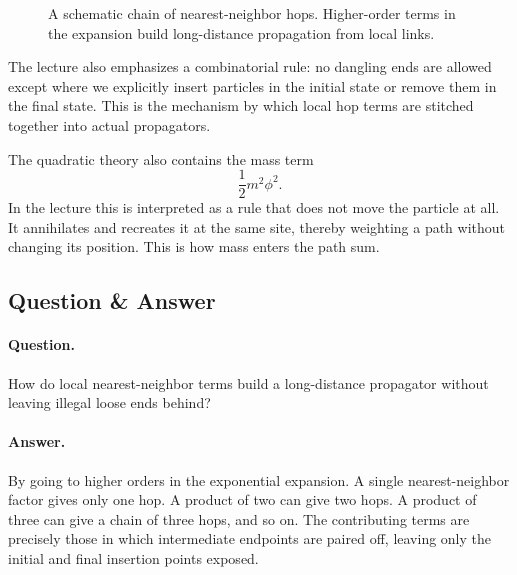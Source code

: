 \begin{figure}[h]
\centering
{}
\caption{A schematic chain of nearest-neighbor hops. Higher-order terms in the expansion build long-distance propagation from local links.}
\end{figure}

The lecture also emphasizes a combinatorial rule: no dangling ends are allowed except where we explicitly insert particles in the initial state or remove them in the final state. This is the mechanism by which local hop terms are stitched together into actual propagators.

The quadratic theory also contains the mass term
\begin{equation}
\frac{1}{2}m^2\phi^2.
\end{equation}
In the lecture this is interpreted as a rule that does not move the particle at all. It annihilates and recreates it at the same site, thereby weighting a path without changing its position. This is how mass enters the path sum.

\subsection{Question \& Answer}

\paragraph{Question.} How do local nearest-neighbor terms build a long-distance propagator without leaving illegal loose ends behind?

\paragraph{Answer.} By going to higher orders in the exponential expansion. A single nearest-neighbor factor gives only one hop. A product of two can give two hops. A product of three can give a chain of three hops, and so on. The contributing terms are precisely those in which intermediate endpoints are paired off, leaving only the initial and final insertion points exposed.

